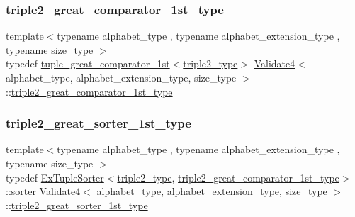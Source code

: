 \subsubsection{\texorpdfstring{triple2\+\_\+great\+\_\+comparator\+\_\+1st\+\_\+type}{triple2\_great\_comparator\_1st\_type}}
{\footnotesize\ttfamily template$<$typename alphabet\+\_\+type , typename alphabet\+\_\+extension\+\_\+type , typename size\+\_\+type $>$ \\
typedef \hyperlink{structtuple__great__comparator__1st}{tuple\+\_\+great\+\_\+comparator\+\_\+1st}$<$\hyperlink{class_validate4_a1e1065b2bd86208beeec8aea6edd3ddd}{triple2\+\_\+type}$>$ \hyperlink{class_validate4}{Validate4}$<$ alphabet\+\_\+type, alphabet\+\_\+extension\+\_\+type, size\+\_\+type $>$\+::\hyperlink{class_validate4_a17f3f46281d706a75c002eed273aeaf8}{triple2\+\_\+great\+\_\+comparator\+\_\+1st\+\_\+type}\hspace{0.3cm}{\ttfamily [private]}}

\mbox{\label{class_validate4_aa35a0ebf404821377118043d536be262}} 
\subsubsection{\texorpdfstring{triple2\+\_\+great\+\_\+sorter\+\_\+1st\+\_\+type}{triple2\_great\_sorter\_1st\_type}}
{\footnotesize\ttfamily template$<$typename alphabet\+\_\+type , typename alphabet\+\_\+extension\+\_\+type , typename size\+\_\+type $>$ \\
typedef \hyperlink{struct_ex_tuple_sorter}{Ex\+Tuple\+Sorter}$<$\hyperlink{class_validate4_a1e1065b2bd86208beeec8aea6edd3ddd}{triple2\+\_\+type}, \hyperlink{class_validate4_a17f3f46281d706a75c002eed273aeaf8}{triple2\+\_\+great\+\_\+comparator\+\_\+1st\+\_\+type}$>$\+::sorter \hyperlink{class_validate4}{Validate4}$<$ alphabet\+\_\+type, alphabet\+\_\+extension\+\_\+type, size\+\_\+type $>$\+::\hyperlink{class_validate4_aa35a0ebf404821377118043d536be262}{triple2\+\_\+great\+\_\+sorter\+\_\+1st\+\_\+type}\hspace{0.3cm}{\ttfamily [private]}}

\mbox{\label{class_validate4_a83e9e52347608368b088892cabbdc8c5}} 

